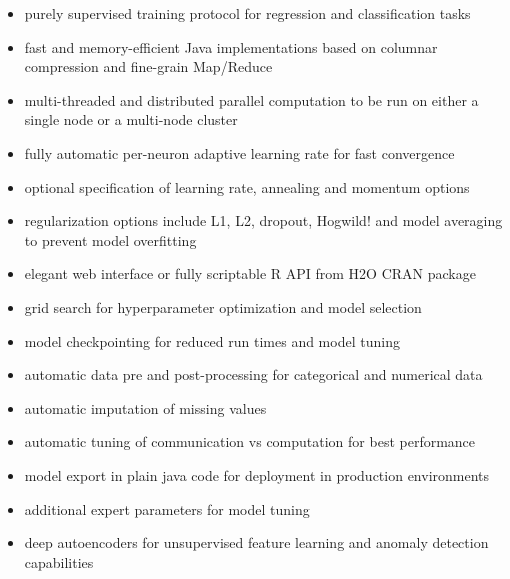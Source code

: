 \documentclass{article}[11pt]
\begin{document}
\begin{itemize}

\item purely supervised training protocol for regression and classification tasks

\item fast and memory-efficient Java implementations based on columnar compression and fine-grain Map/Reduce

\item multi-threaded and distributed parallel computation to be run on either a single node or a multi-node cluster

\item fully automatic per-neuron adaptive learning rate for fast convergence

\item optional specification of learning rate, annealing and momentum options

\item regularization options include L1, L2, dropout, Hogwild! and model averaging to prevent model overfitting

\item elegant web interface or fully scriptable R API from H2O CRAN package

\item grid search for hyperparameter optimization and model selection

\item model checkpointing for reduced run times and model tuning

\item automatic data pre and post-processing for categorical and numerical data

\item automatic imputation of missing values

\item automatic tuning of communication vs computation for best performance

\item model export in plain java code for deployment in production environments

\item additional expert parameters for model tuning

\item deep autoencoders for unsupervised feature learning and anomaly detection capabilities

\end{itemize}
\end{document}
